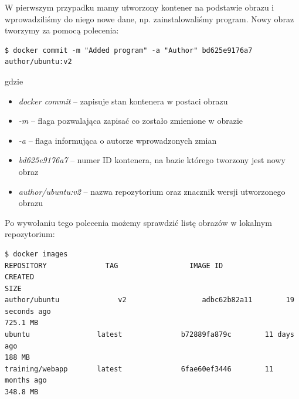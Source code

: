  W pierwszym przypadku mamy utworzony kontener na podstawie obrazu i wprowadziliśmy do niego nowe dane, np. zainstalowaliśmy program. Nowy obraz tworzymy za pomocą polecenia:
\begin{lstlisting}[style=incode]
$ docker commit -m "Added program" -a "Author" bd625e9176a7 author/ubuntu:v2
\end{lstlisting}
gdzie
\begin{itemize}

\item \textit{docker commit} – zapisuje stan kontenera w postaci obrazu
\item \textit{-m} – flaga pozwalająca zapisać co zostało zmienione w obrazie
\item \textit{-a} – flaga informująca o autorze wprowadzonych zmian
\item \textit{bd625e9176a7} –  numer ID kontenera, na bazie którego tworzony jest nowy obraz
\item \textit{author/ubuntu:v2} – nazwa repozytorium oraz znacznik wersji utworzonego obrazu
\end{itemize}
Po wywołaniu tego polecenia możemy sprawdzić listę obrazów w lokalnym repozytorium:
\begin{lstlisting}[style=incode]
$ docker images
REPOSITORY          	TAG                 IMAGE ID            	     CREATED             	
SIZE
author/ubuntu       	   v2                  adbc62b82a11        19 seconds ago      	
725.1 MB
ubuntu         		  latest              b72889fa879c        11 days ago             	
188 MB
training/webapp   	  latest              6fae60ef3446        11 months ago     	  
348.8 MB 
\end{lstlisting}


